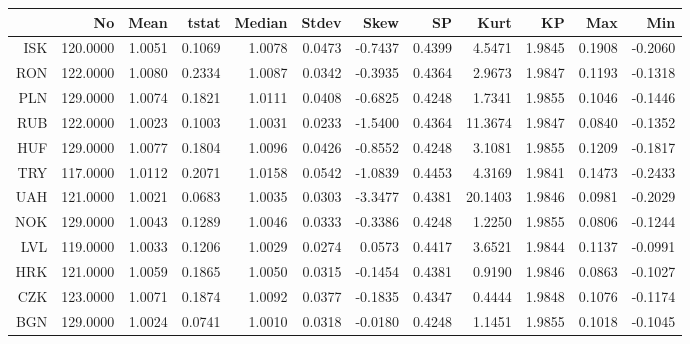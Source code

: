 \documentclass{aRTICLE}\usepackage{graphicx, color}
\begin{document}
\begin{table}[ht]
\begin{center}
\begin{tabular}{rrrrrrrrrrrr}
  \hline
 & No & Mean & tstat & Median & Stdev & Skew & SP & Kurt & KP & Max & Min \\ 
  \hline
ISK & 120.0000 & 1.0051 & 0.1069 & 1.0078 & 0.0473 & -0.7437 & 0.4399 & 4.5471 & 1.9845 & 0.1908 & -0.2060 \\ 
  RON & 122.0000 & 1.0080 & 0.2334 & 1.0087 & 0.0342 & -0.3935 & 0.4364 & 2.9673 & 1.9847 & 0.1193 & -0.1318 \\ 
  PLN & 129.0000 & 1.0074 & 0.1821 & 1.0111 & 0.0408 & -0.6825 & 0.4248 & 1.7341 & 1.9855 & 0.1046 & -0.1446 \\ 
  RUB & 122.0000 & 1.0023 & 0.1003 & 1.0031 & 0.0233 & -1.5400 & 0.4364 & 11.3674 & 1.9847 & 0.0840 & -0.1352 \\ 
  HUF & 129.0000 & 1.0077 & 0.1804 & 1.0096 & 0.0426 & -0.8552 & 0.4248 & 3.1081 & 1.9855 & 0.1209 & -0.1817 \\ 
  TRY & 117.0000 & 1.0112 & 0.2071 & 1.0158 & 0.0542 & -1.0839 & 0.4453 & 4.3169 & 1.9841 & 0.1473 & -0.2433 \\ 
  UAH & 121.0000 & 1.0021 & 0.0683 & 1.0035 & 0.0303 & -3.3477 & 0.4381 & 20.1403 & 1.9846 & 0.0981 & -0.2029 \\ 
  NOK & 129.0000 & 1.0043 & 0.1289 & 1.0046 & 0.0333 & -0.3386 & 0.4248 & 1.2250 & 1.9855 & 0.0806 & -0.1244 \\ 
  LVL & 119.0000 & 1.0033 & 0.1206 & 1.0029 & 0.0274 & 0.0573 & 0.4417 & 3.6521 & 1.9844 & 0.1137 & -0.0991 \\ 
  HRK & 121.0000 & 1.0059 & 0.1865 & 1.0050 & 0.0315 & -0.1454 & 0.4381 & 0.9190 & 1.9846 & 0.0863 & -0.1027 \\ 
  CZK & 123.0000 & 1.0071 & 0.1874 & 1.0092 & 0.0377 & -0.1835 & 0.4347 & 0.4444 & 1.9848 & 0.1076 & -0.1174 \\ 
  BGN & 129.0000 & 1.0024 & 0.0741 & 1.0010 & 0.0318 & -0.0180 & 0.4248 & 1.1451 & 1.9855 & 0.1018 & -0.1045 \\ 
   \hline
\end{tabular}
\end{center}
\end{table}
\end{document}
